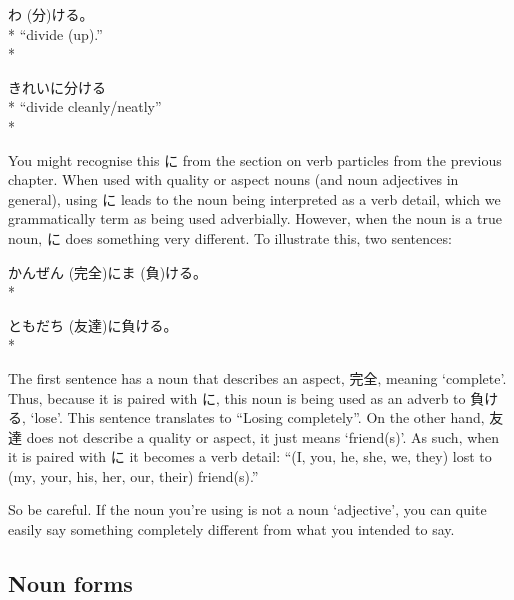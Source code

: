 \documentclass[11pt, b5paper, twoside, openright, onecolumn]{book}
\makeatletter
\newcommand*{\rubystack}[2]{{\relscale{0.5}%
  \begin{tabular}[b]{@{}c@{}}%
    {#1}\\%
   {\textscale{2}{#2}}%
  \end{tabular}}%
}
\DeclareRobustCommand*{\ruby}[2]{%
  \mbox{%
    \setlength{\parskip}{0ex}%
    \BeginAccSupp{method=pdfstringdef,ActualText={#1}}%
      \rubystack{\phantom{#2}}{#1}%
      \llap{%
        \rubystack{#2}{\phantom{#1}}%
      }%
    \EndAccSupp{}%
  }%
}
\renewcommand*{\ruby}[2]{#2 (#1)}%
\newenvironment{exampleblock}{
\setlength{\parindent}{0.6in}
\begin{minipage}[t]{\dimexpr\textwidth-\parindent}}
{\end{minipage}}
\makeatother
\begin{document}
\vspace{0.4cm}
\begin{exampleblock}
\ruby{分}{わ}ける。 \\* 
“divide (up).” \\* 
\end{exampleblock}
\vspace{0.2cm}

\begin{exampleblock}
きれいに分ける \\* 
“divide cleanly/neatly” \\* 
\end{exampleblock}
\vspace{0.2cm}

You might recognise this に from the section on verb particles from the previous chapter. When used with quality or aspect nouns (and noun adjectives in general)‚ using に leads to the noun being interpreted as a verb detail‚ which we grammatically term as being used adverbially. However‚ when the noun is a true noun‚ に does something very different. To illustrate this‚ two sentences:

\vspace{0.4cm}
\begin{exampleblock}
\ruby{完全}{かんぜん}に\ruby{負}{ま}ける。 \\* 
\end{exampleblock}
\vspace{0.2cm}

\begin{exampleblock}
\ruby{友達}{ともだち}に負ける。 \\* 
\end{exampleblock}
\vspace{0.2cm}

The first sentence has a noun that describes an aspect‚ 完全‚ meaning ‘complete’. Thus‚ because it is paired with に‚ this noun is being used as an adverb to 負ける‚ ‘lose’. This sentence translates to “Losing completely”. On the other hand‚ 友達 does not describe a quality or aspect‚ it just means ‘friend(s)’. As such‚ when it is paired with に it becomes a verb detail: “(I‚ you‚ he‚ she‚ we‚ they) lost to (my‚ your‚ his‚ her‚ our‚ their) friend(s).”

So be careful. If the noun you’re using is not a noun ‘adjective’‚ you can quite easily say something completely different from what you intended to say.

\subsection{Noun forms}
\end{document}
